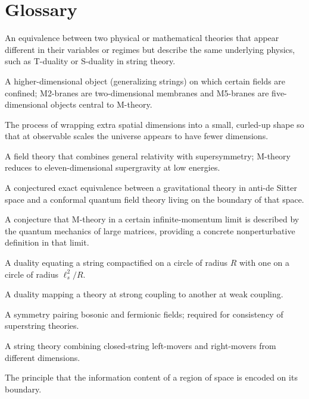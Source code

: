 \section*{Glossary}
\begin{description}[leftmargin=*,style=nextline,itemsep=0.3em]
\item[\textbf{Duality.}] An equivalence between two physical or mathematical theories that appear different in their variables or regimes but describe the same underlying physics, such as T-duality or S-duality in string theory.
\item[\textbf{Brane.}] A higher-dimensional object (generalizing strings) on which certain fields are confined; M2-branes are two-dimensional membranes and M5-branes are five-dimensional objects central to M-theory.
\item[\textbf{Compactification.}] The process of wrapping extra spatial dimensions into a small, curled-up shape so that at observable scales the universe appears to have fewer dimensions.
\item[\textbf{Supergravity.}] A field theory that combines general relativity with supersymmetry; M-theory reduces to eleven-dimensional supergravity at low energies.
\item[\textbf{AdS/CFT correspondence.}] A conjectured exact equivalence between a gravitational theory in anti-de Sitter space and a conformal quantum field theory living on the boundary of that space.
\item[\textbf{BFSS matrix model.}] A conjecture that M-theory in a certain infinite-momentum limit is described by the quantum mechanics of large matrices, providing a concrete nonperturbative definition in that limit.
\item[\textbf{T-duality.}] A duality equating a string compactified on a circle of radius $R$ with one on a circle of radius $\ell_s^2/R$.
\item[\textbf{S-duality.}] A duality mapping a theory at strong coupling to another at weak coupling.
\item[\textbf{Supersymmetry.}] A symmetry pairing bosonic and fermionic fields; required for consistency of superstring theories.
\item[\textbf{Heterotic string.}] A string theory combining closed-string left-movers and right-movers from different dimensions.
\item[\textbf{Holographic principle.}] The principle that the information content of a region of space is encoded on its boundary.
\end{description}

